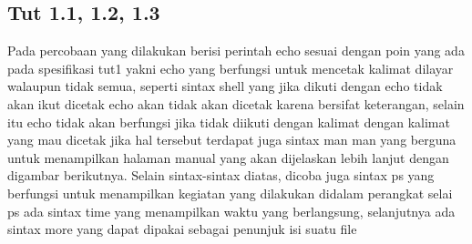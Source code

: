 \documentclass[11pt,a4paper]{article}
\begin{document}
\subsection{Tut 1.1, 1.2, 1.3}
Pada percobaan yang dilakukan berisi perintah echo sesuai dengan poin yang ada pada spesifikasi tut1 yakni echo yang berfungsi untuk mencetak kalimat dilayar walaupun tidak semua, seperti sintax shell yang jika dikuti dengan echo tidak akan ikut dicetak echo akan tidak akan dicetak karena bersifat keterangan, selain itu echo tidak akan berfungsi jika tidak diikuti dengan kalimat dengan kalimat yang mau dicetak jika hal tersebut  terdapat juga sintax man man yang berguna untuk menampilkan halaman manual yang akan dijelaskan lebih lanjut dengan digambar berikutnya. Selain sintax-sintax diatas, dicoba juga sintax ps yang berfungsi untuk menampilkan kegiatan yang dilakukan didalam perangkat selai ps ada sintax time yang menampilkan waktu yang berlangsung, selanjutnya ada sintax more yang dapat dipakai sebagai penunjuk isi suatu file
\end{document}
